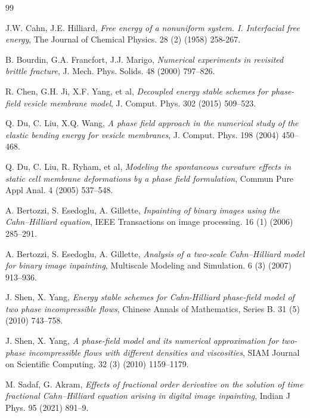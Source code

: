 \documentclass{siamart171218}
\theoremstyle{remark}
\theoremstyle{example}
\numberwithin{equation}{section}
\begin{document}

%
\begin{thebibliography}{99}


{\sc J.W. Cahn, J.E. Hilliard}, {\em  Free energy of a nonuniform system. I. Interfacial free energy}, The Journal of Chemical Physics. 28 (2) (1958) 258-267.

{\sc B. Bourdin, G.A. Francfort, J.J. Marigo}, {\em Numerical experiments in revisited brittle fracture}, J. Mech. Phys. Solids. 48 (2000) 797–826.

{\sc R. Chen, G.H. Ji, X.F. Yang, et al}, {\em Decoupled energy stable schemes for phase-field vesicle membrane model}, J. Comput. Phys. 302 (2015) 509–523.

{\sc Q. Du, C. Liu, X.Q. Wang}, {\em A phase field approach in the numerical study of the elastic bending energy for vesicle membranes}, J. Comput. Phys. 198 (2004) 450–468.

{\sc Q. Du, C. Liu, R. Ryham, et al}, {\em Modeling the spontaneous curvature effects in static cell membrane deformations by a phase field formulation}, Commun Pure Appl Anal. 4 (2005) 537–548.

{\sc A. Bertozzi, S. Esedoglu, A. Gillette}, {\em Inpainting of binary images using the Cahn–Hilliard equation}, IEEE Transactions on image processing. 16 (1) (2006) 285–291.

{\sc A. Bertozzi, S. Esedoglu, A. Gillette}, {\em Analysis of a two-scale Cahn–Hilliard model for binary image inpainting}, Multiscale Modeling and Simulation. 6 (3) (2007) 913–936.

{\sc J. Shen, X. Yang}, {\em Energy stable schemes for Cahn-Hilliard phase-field model of two phase incompressible flows}, Chinese Annals of Mathematics, Series B. 31 (5) (2010) 743–758.

{\sc J. Shen, X. Yang}, {\em A phase-field model and its numerical approximation for two-phase incompressible flows with different densities and viscosities}, SIAM Journal on
Scientific Computing. 32 (3) (2010) 1159–1179.

{\sc M. Sadaf, G. Akram}, {\em Effects of fractional order derivative on the solution of time fractional Cahn–Hilliard equation arising in digital image inpainting}, Indian J
Phys. 95 (2021) 891–9.


\end{thebibliography}
\end{document}
